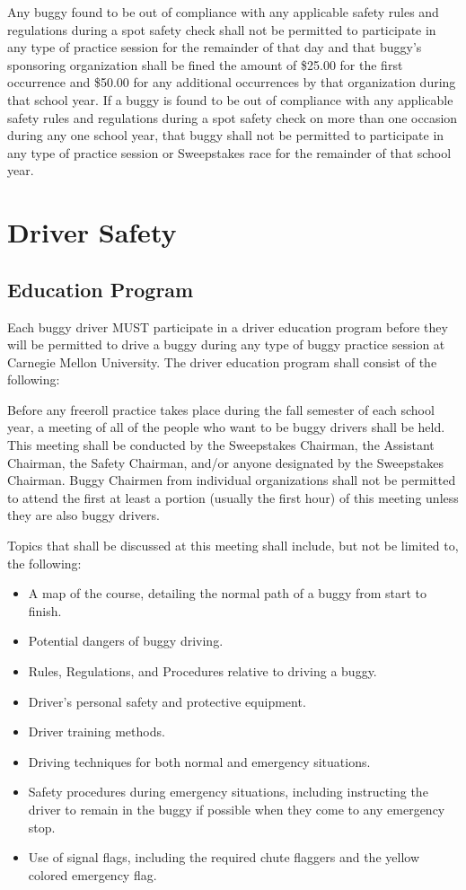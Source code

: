 	Any buggy found to be out of compliance with any applicable safety rules and regulations during a spot safety check shall not be permitted to participate in any type of practice session for the remainder of that day and that buggy's sponsoring organization shall be fined the amount of \$25.00 for the first occurrence and \$50.00 for any additional occurrences by that organization during that school year. If a buggy is found to be out of compliance with any applicable safety rules and regulations during a spot safety check on more than one occasion during any one school year, that buggy shall not be permitted to participate in any type of practice session or Sweepstakes race for the remainder of that school year.

\section{Driver Safety}

\subsection{Education Program}

	Each buggy driver MUST participate in a driver education program before they will be permitted to drive a buggy during any type of buggy practice session at Carnegie Mellon University. The driver education program shall consist of the following:

	Before any freeroll practice takes place during the fall semester of each school year, a meeting of all of the people who want to be buggy drivers shall be held. This meeting shall be conducted by the Sweepstakes Chairman, the Assistant Chairman, the Safety Chairman, and/or anyone designated by the Sweepstakes Chairman. Buggy Chairmen from individual organizations shall not be permitted to attend the first at least a portion (usually the first hour) of this meeting unless they are also buggy drivers.

	Topics that shall be discussed at this meeting shall include, but not be limited to, the following:

	\begin{itemize}
		\item A map of the course, detailing the normal path of a buggy from start to finish.
		\item Potential dangers of buggy driving.
		\item Rules, Regulations, and Procedures relative to driving a buggy.
		\item Driver's personal safety and protective equipment.
		\item Driver training methods.
		\item Driving techniques for both normal and emergency situations.
		\item Safety procedures during emergency situations, including instructing the driver to remain in the buggy if possible when they come to any emergency stop.
		\item Use of signal flags, including the required chute flaggers and the yellow colored emergency flag.
	\end{itemize}

